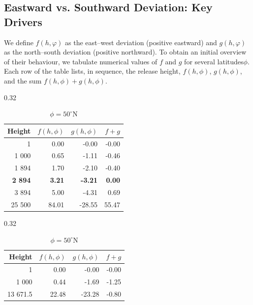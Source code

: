 \documentclass[11pt,en]{elegantpaper}
\begin{document}
\subsection{Eastward vs. Southward Deviation: Key Drivers}
We define $f(h,\varphi)$ as the east–west deviation (positive eastward) and $g(h,\varphi)$ as the north–south deviation (positive northward).
To obtain an initial overview of their behaviour, we tabulate numerical values of $f$ and $g$ for several latitudes$\phi$.
Each row of the table lists, in sequence, the release height, $f(h,\phi)$, $g(h,\phi)$, and the sum $f(h,\phi)+g(h,\phi)$.

\begin{table}[htbp]
	\centering
	\caption{Sample heights around the root of $f(h,\phi)+g(h,\phi)\!=\!0$ (values in metres)}
	\small  %
	\begin{subtable}[t]{0.32\textwidth}
		\centering
		\caption{$\phi = 20^{\circ}\mathrm{N}$}
		\begin{tabular}{rrrr}
			\toprule
			Height         & $f(h,\phi)$   & $g(h,\phi)$    & $f+g$         \\
			\midrule
			1              & 0.00          & -0.00          & -0.00         \\
			1 000          & 0.65          & -1.11          & -0.46         \\
			1 894          & 1.70          & -2.10          & -0.40         \\
			\textbf{2 894} & \textbf{3.21} & \textbf{-3.21} & \textbf{0.00} \\
			3 894          & 5.00          & -4.31          & 0.69          \\
			25 500         & 84.01         & -28.55         & 55.47         \\
			\bottomrule
		\end{tabular}
	\end{subtable}
	\hfill
	\begin{subtable}[t]{0.32\textwidth}
		\centering
		\caption{$\phi = 50^{\circ}\mathrm{N}$}
		\begin{tabular}{rrrr}
			\toprule
			Height            & $f(h,\phi)$    & $g(h,\phi)$     & $f+g$         \\
			\midrule
			1                 & 0.00           & -0.00           & -0.00         \\
			1 000             & 0.44           & -1.69           & -1.25         \\
			13 671.5          & 22.48          & -23.28          & -0.80         \\

\end{tabular}
\end{subtable}
\end{table}
\end{document}
